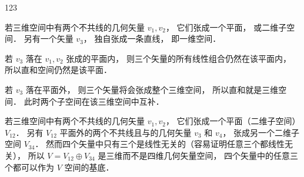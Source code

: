 \begin{theorem}{}
123
\end{theorem}

\begin{example}{}\label{DirSum_ex1}
若三维空间中有两个不共线的几何矢量 ${v_1}, {v_2}$， 它们张成一个平面， 或二维子空间． 另有一个矢量 ${v_3}$， 独自张成一条直线， 即一维空间．

若 ${v_3}$ 落在 ${v_1}, {v_2}$ 张成的平面内， 则三个矢量的所有线性组合仍然在该平面内， 所以直和空间仍然是该平面．

若 ${v_3}$ 落在平面外， 则三个矢量将会张成整个三维空间， 所以直和就是三维空间． 此时两个子空间在该三维空间中互补．
\end{example}

\begin{example}{}\label{DirSum_ex2}
若三维空间中有两个不共线的几何矢量 ${v_1}, {v_2}$， 它们张成一个平面（二维子空间） $V_{12}$． 另有 $V_{12}$ 平面外的两个不共线且与的几何矢量 ${v_3}$ 和 ${v_4}$， 张成另一个二维子空间 $V_{34}$． 然而四个矢量中只有三个是线性无关的（容易证明任意三个都线性无关）， 所以 $V = V_{12} \oplus V_{34}$ 是三维而不是四维几何矢量空间， 四个矢量中的任意三个都可以作为 $V$ 空间的基底．
\end{example}
